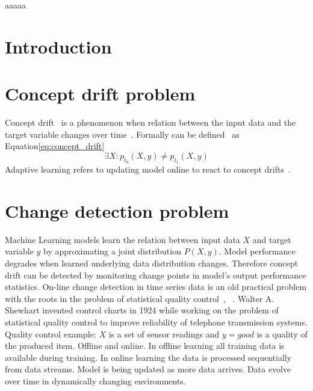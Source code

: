 \documentclass[licentiate,utf8,lot,loar,lof,shortloft,index]{jydiss}
\begin{document}
\preface
{} aaaaa
\acknowledgements
\begin{notations}
\end{notations}
\mainmatter

\chapter{Introduction}
\chapter{Concept drift problem}
Concept drift~\cite{schlimmer1986incremental,gama2014survey} is a
phenomenon when relation between the input data and the target variable changes
over time~\cite{gama2014survey}.
Formally can be defined~\cite{gama2014survey} as Equation\ref{eq:concept_drift} 
\begin{equation}\label{eq:concept_drift}
\exists X: p_{t_0}(X,y) \neq  p_{t_1}(X,y)
\end{equation}
Adaptive learning refers to updating model online to react to concept
drifts~\cite{gama2014survey}.
\chapter{Change detection problem}
Machine Learning models learn the relation between input data $X$ and target
variable $y$ by approximating a joint distribution $P(X,y)$.  Model performance
degrades when learned underlying data distribution changes.  Therefore concept
drift can be detected by monitoring change points in model's output performance
statistics.
On-line change detection in time series data is an old practical problem with
the roots in the problem of statistical quality
control~\cite{basseville1993detection}, ~\cite{NISTbook}.  Walter A. Shewhart
invented control charts in 1924 while working on the problem of statistical
quality control to improve reliability of telephone transmission systems.
Quality control example: $X$ is a set of sensor readings and $y=good$ is a
quality of the produced item.
Offline and online.
In offline learning all training data is available during training.
In online learning the data is processed sequentially from data streams.
Model is being updated as more data arrives.
Data evolve over time in dynamically changing environments.
\end{document}
